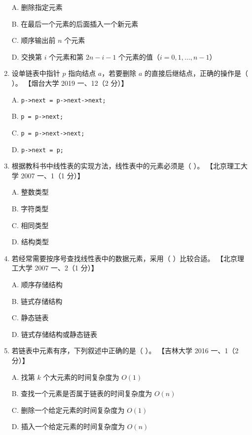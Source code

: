 \documentclass[lang=cn,newtx,10pt,scheme=chinese]{../../elegantbook}
\begin{document}
\begin{enumerate}
    A. 删除指定元素  

    B. 在最后一个元素的后面插入一个新元素  

    C. 顺序输出前 $n$ 个元素  

    D. 交换第 $i$ 个元素和第 $2n-i-1$ 个元素的值（$i=0, 1, \dots, n-1$）  

    \item 设单链表中指针 $p$ 指向结点 $a$，若要删除 $a$ 的直接后继结点，正确的操作是（ ）。  
    【烟台大学 2019 一、12（2 分）】  

    A. \texttt{p->next = p->next->next;}  

    B. \texttt{p = p->next;}  

    C. \texttt{p = p->next->next;}  

    D. \texttt{p->next = p;}  

    \item 根据教科书中线性表的实现方法，线性表中的元素必须是（ ）。  
    【北京理工大学 2007 一、1（1 分）】  

    A. 整数类型  

    B. 字符类型  

    C. 相同类型  

    D. 结构类型  

    \item 若经常需要按序号查找线性表中的数据元素，采用（ ）比较合适。  
    【北京理工大学 2007 一、2（1 分）】  

    A. 顺序存储结构  

    B. 链式存储结构  

    C. 静态链表  

    D. 链式存储结构或静态链表  

    \item 若链表中元素有序，下列叙述中正确的是（ ）。  
    【吉林大学 2016 一、1（2 分）】  

    A. 找第 $k$ 个大元素的时间复杂度为 $O(1)$  

    B. 查找一个元素是否属于链表的时间复杂度为 $O(n)$  

    C. 删除一个给定元素的时间复杂度为 $O(1)$  

    D. 插入一个给定元素的时间复杂度为 $O(n)$ 
\end{enumerate}
\end{document}
